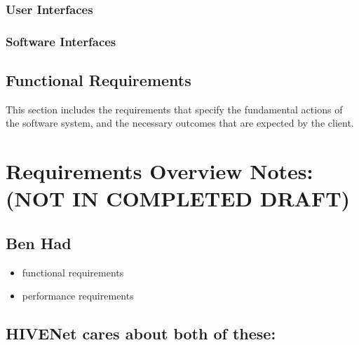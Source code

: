 \documentclass[onecolumn, draftclsnofoot,10pt, compsoc]{IEEEtran}
\begin{document}
		\subsubsection{User Interfaces}
		\subsubsection{Software Interfaces}
	\subsection{Functional Requirements}
This section includes the requirements that specify the fundamental actions of the software system, and the necessary outcomes that are expected by the client.


\section{Requirements Overview Notes: (NOT IN COMPLETED DRAFT)}
\subsection{Ben Had}
\begin{itemize}
		\item functional requirements
		\item performance requirements
	
\end{itemize}
\subsection {HIVENet cares about both of these:}
\end{document}
